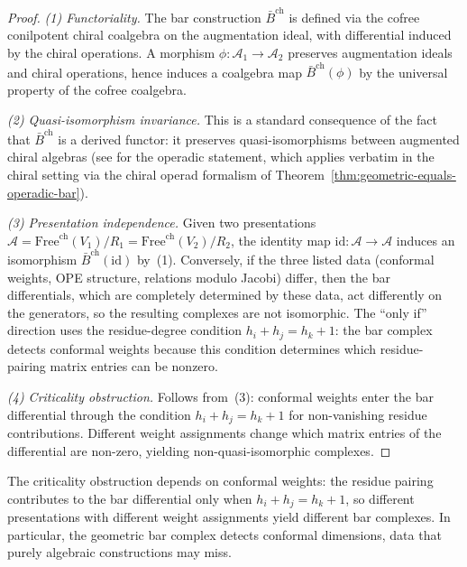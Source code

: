  \begin{proof}
 \emph{(1) Functoriality.} The bar construction $\bar{B}^{\mathrm{ch}}$ is defined via the cofree conilpotent chiral coalgebra on the augmentation ideal, with differential induced by the chiral operations. A morphism $\phi\colon \mathcal{A}_1 \to \mathcal{A}_2$ preserves augmentation ideals and chiral operations, hence induces a coalgebra map $\bar{B}^{\mathrm{ch}}(\phi)$ by the universal property of the cofree coalgebra.

 \emph{(2) Quasi-isomorphism invariance.} This is a standard consequence of the fact that $\bar{B}^{\mathrm{ch}}$ is a derived functor: it preserves quasi-isomorphisms between augmented chiral algebras (see \cite[Theorem~2.2.4]{LV12} for the operadic statement, which applies verbatim in the chiral setting via the chiral operad formalism of Theorem~\ref{thm:geometric-equals-operadic-bar}).

 \emph{(3) Presentation independence.} Given two presentations $\mathcal{A} = \mathrm{Free}^{\mathrm{ch}}(V_1)/R_1 = \mathrm{Free}^{\mathrm{ch}}(V_2)/R_2$, the identity map $\mathrm{id}\colon \mathcal{A} \to \mathcal{A}$ induces an isomorphism $\bar{B}^{\mathrm{ch}}(\mathrm{id})$ by~(1). Conversely, if the three listed data (conformal weights, OPE structure, relations modulo Jacobi) differ, then the bar differentials, which are completely determined by these data, act differently on the generators, so the resulting complexes are not isomorphic. The ``only if'' direction uses the residue-degree condition
 $h_i+h_j=h_k+1$: the bar complex detects conformal weights because
 this condition determines which residue-pairing matrix entries can be
 nonzero.

 \emph{(4) Criticality obstruction.} Follows from~(3): conformal weights enter the bar differential through the condition $h_i + h_j = h_k + 1$ for non-vanishing residue contributions. Different weight assignments change which matrix entries of the differential are non-zero, yielding non-quasi-isomorphic complexes.
 \end{proof}

 \begin{remark}\label{rem:criticality-conformal-weight}
 The criticality obstruction depends on conformal weights: the residue pairing
 contributes to the bar differential only when $h_i + h_j = h_k + 1$, so
 different presentations with different weight assignments yield different bar
 complexes. In particular, the geometric bar complex detects conformal
 dimensions, data that purely algebraic constructions may miss.
 \end{remark}


